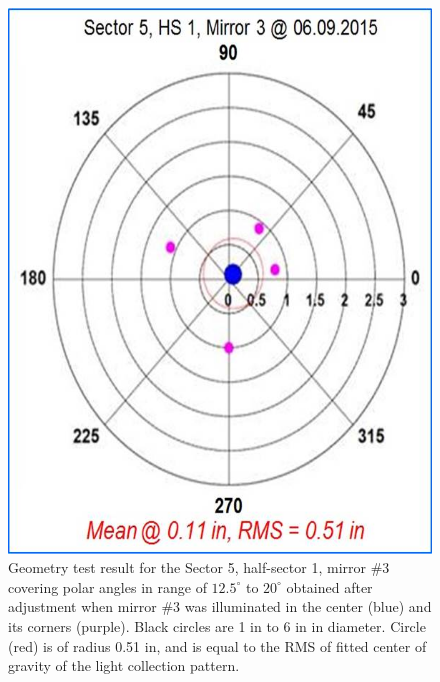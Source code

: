 \begin{figure}[ht]
    \centering
    \includegraphics[width=1.0\linewidth,trim={0 0cm 0 0},clip]{images/Ch_5_1_3_After_NEW.jpg}
    \caption{Geometry test result for the Sector 5, half-sector 1, mirror \#3 covering polar angles in range of $12.5^\circ$ to $20^\circ$ obtained after adjustment when mirror \#3 was illuminated in the center (blue) and its corners (purple). Black circles are 1 in to 6 in in diameter. Circle (red) is of radius 0.51 in, and is equal to the RMS of fitted center of gravity  of the light collection pattern.}
    \label{fig:Ch_5_1_3_After_NEW}
\end{figure}

